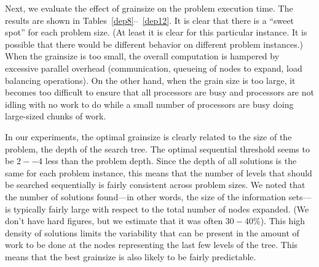 \documentclass[times, 10pt,twocolumn]{article}
\begin{document}
Next, we evaluate the effect of grainsize on the problem execution time.  The results are shown in
Tables~\ref{dep8}--~\ref{dep12}.  It is clear that there is a ``sweet spot'' for each problem size.  (At least it is
clear for this particular instance.  It is possible that there would be different behavior on different problem
instances.)  When the grainsize is too small, the overall computation is hampered by excessive parallel overhead
(communication, queueing of nodes to expand, load balancing operations).  On the other hand, when the grain size is too
large, it becomes too difficult to ensure that all processors are busy and processors are not idling with no work to do
while a small number of processors are busy doing large-sized chunks of work.  

In our experiments, the optimal grainsize is clearly related to the size of the problem, the depth of the search tree.
The optimal sequential threshold seems to be $2--4$ less than the problem depth.  Since the depth of all solutions is
the same for each problem instance, this means that the number of levels that should be searched sequentially is fairly
consistent across problem sizes.  We noted that the number of solutions found---in other words, the size of the
information sets---is typically fairly large with respect to the total number of nodes expanded.  (We don't have hard
figures, but we estimate that it was often $30-40\%$).  This high density of solutions limits the variability that can
be present in the amount of work to be done at the nodes representing the last few levels of the tree.  This means that
the best grainsize is also likely to be fairly predictable.  
\end{document}
